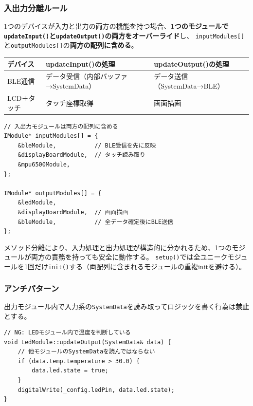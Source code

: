 \subsubsection{入出力分離ルール}

1つのデバイスが入力と出力の両方の機能を持つ場合、\textbf{1つのモジュールで\texttt{updateInput()}と\texttt{updateOutput()}の両方をオーバーライド}し、
\texttt{inputModules[]}と\texttt{outputModules[]}の\textbf{両方の配列に含める}。

\begin{tabularx}{\textwidth}{l l l}
\toprule
\textbf{デバイス} & \textbf{updateInput()の処理} & \textbf{updateOutput()の処理} \\
\midrule
BLE通信 & データ受信（内部バッファ→SystemData） & データ送信（SystemData→BLE） \\
LCD＋タッチ & タッチ座標取得 & 画面描画 \\
\bottomrule
\end{tabularx}

\begin{lstlisting}[style=cppstyle, caption={入出力モジュールの配列配置}]
// 入出力モジュールは両方の配列に含める
IModule* inputModules[] = {
    &bleModule,           // BLE受信を先に反映
    &displayBoardModule,  // タッチ読み取り
    &mpu6500Module,
};

IModule* outputModules[] = {
    &ledModule,
    &displayBoardModule,  // 画面描画
    &bleModule,           // 全データ確定後にBLE送信
};
\end{lstlisting}

メソッド分離により、入力処理と出力処理が構造的に分かれるため、1つのモジュールが両方の責務を持っても安全に動作する。
\texttt{setup()}では全ユニークモジュールを1回だけ\texttt{init()}する（両配列に含まれるモジュールの重複initを避ける）。

\subsubsection{アンチパターン}

出力モジュール内で入力系の\texttt{SystemData}を読み取ってロジックを書く行為は\textbf{禁止}とする。

\begin{lstlisting}[style=cppstyle, caption={アンチパターン：出力モジュール内でロジックを持つ（禁止）}]
// NG: LEDモジュール内で温度を判断している
void LedModule::updateOutput(SystemData& data) {
    // 他モジュールのSystemDataを読んではならない
    if (data.temp.temperature > 30.0) {
        data.led.state = true;
    }
    digitalWrite(_config.ledPin, data.led.state);
}
\end{lstlisting}

